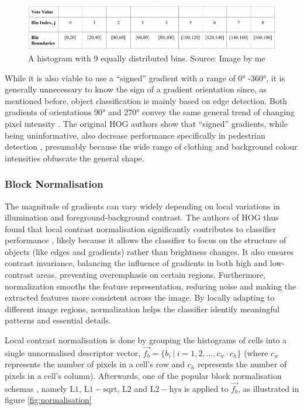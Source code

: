 \begin{figure}
    \centering
    \includegraphics[width=0.75\linewidth]{images/histogram_bins.png}
    \caption{A histogram with 9 equally distributed bins. Source: Image by me}
    \label{fig:histogram_bins}
\end{figure}


While it is also viable to use a “signed” gradient with a range of 0° -360°, it is generally unnecessary to know the sign of a gradient orientation since, as mentioned before, object classification is mainly based on edge detection. Both gradients of orientations 90° and 270° convey the same general trend of changing pixel intensity \cite{shidlovskiy_2020_reducing}. The original HOG authors show that “signed” gradients, while being uninformative, also decrease performance specifically in pedestrian detection \cite{dalal_2005_histograms}, presumably because the wide range of clothing and background colour intensities obfuscate the general shape.

\subsubsection{Block Normalisation}

The magnitude of gradients can vary widely depending on local variations in illumination and foreground-background contrast. The authors of HOG thus found that local contrast normalisation significantly contributes to classifier performance \cite{dalal_2005_histograms}, likely because it allows the classifier to focus on the structure of objects (like edges and gradients) rather than brightness changes. It also ensures contrast invariance, balancing the influence of gradients in both high and low-contrast areas, preventing overemphasis on certain regions. Furthermore, normalization smooths the feature representation, reducing noise and making the extracted features more consistent across the image. By locally adapting to different image regions, normalization helps the classifier identify meaningful patterns and essential details.


Local contrast normalisation is done by grouping the histograms of cells into a single unnormalised descriptor vector, $\vec{f_{b}} = \{ b_{i} \ |\ i=1,2,\dots, c_w \cdot c_h \}$ (where $c_w$ represents the number of pixels in a cell's row and $c_h$ represents the number of pixels in a cell's column). Afterwards, one of the popular block normalisation schemas \cite{dalal_2005_histograms}, namely $\mathrm{L1}$, $\mathrm{L1-sqrt}$, $\mathrm{L2}$ and $\mathrm{L2-hys}$ is applied to $\vec{f_b}$, as illustrated in figure \ref{fig:normalisation}

